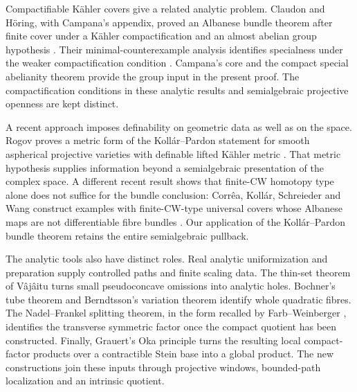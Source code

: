 Compactifiable K\"ahler covers give a related analytic problem.
Claudon and H\"oring, with Campana's appendix, proved an Albanese
bundle theorem after finite cover under a K\"ahler compactification
and an almost abelian group hypothesis
\cite[Theorem~1.5]{ClaudonHoering2013}. Their minimal-counterexample
analysis identifies specialness under the weaker compactification
condition \cite[Proposition~1.4]{ClaudonHoering2013}. Campana's core
\cite{Campana2004} and the compact special abelianity theorem
\cite{SpecialAbelianity} provide the group input in the present
proof. The compactification conditions in these analytic results
and semialgebraic projective openness are kept distinct.

A recent approach imposes definability on geometric data as well
as on the space. Rogov proves a metric form of the Koll\'ar--Pardon
statement for smooth aspherical projective varieties with definable
lifted K\"ahler metric \cite[Theorem~C]{Rogov2024}. That metric
hypothesis supplies information beyond a semialgebraic presentation
of the complex space. A different recent result shows that finite-CW
homotopy type alone does not suffice for the bundle conclusion:
Corr\^ea, Koll\'ar, Schreieder and Wang construct examples
with finite-CW-type universal covers whose Albanese maps are not
differentiable fibre bundles
\cite[Corollary~30]{CorreaKollarSchreiederWang2026}.
Our application of the Koll\'ar--Pardon bundle theorem retains the
entire semialgebraic pullback.

The analytic tools also have distinct roles. Real analytic
uniformization and preparation
\cite{BierstoneMilman1988,LionRolin1997} supply controlled paths and
finite scaling data. The thin-set theorem of V\^aj\^aitu
\cite{Vajaitu2000} turns small pseudoconcave omissions into analytic
holes. Bochner's tube theorem and Berndtsson's variation theorem
\cite{Noguchi2020,Berndtsson2006} identify whole quadratic fibres.
The Nadel--Frankel splitting theorem, in the form recalled by
Farb--Weinberger \cite[Theorem~1.10]{FarbWeinberger2008}, identifies
the transverse symmetric factor once the compact quotient has been
constructed. Finally, Grauert's Oka principle
\cite{Grauert1958,ForstnericPrezelj2000} turns the resulting local
compact-factor products over a contractible Stein base into a global
product. The new constructions join these inputs through projective
windows, bounded-path localization and an intrinsic quotient.
